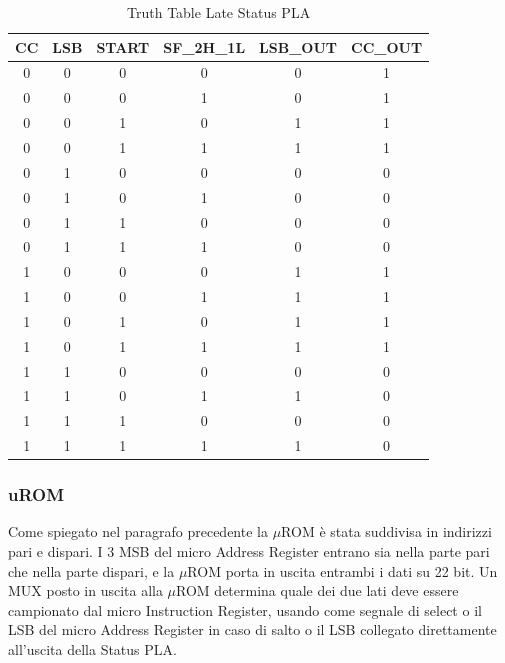 \begin{table}[h!]
    \centering
    \begin{tabular}{|c|c|c|c||c|c|}
        \hline
        CC & LSB & START & SF\_2H\_1L & LSB\_OUT & CC\_OUT \\ \hline
         0 &  0  &   0   &     0      &     0    &    1    \\ \hline
         0 &  0  &   0   &     1      &     0    &    1    \\ \hline
         0 &  0  &   1   &     0      &     1    &    1    \\ \hline
         0 &  0  &   1   &     1      &     1    &    1    \\ \hline
         0 &  1  &   0   &     0      &     0    &    0    \\ \hline
         0 &  1  &   0   &     1      &     0    &    0    \\ \hline
         0 &  1  &   1   &     0      &     0    &    0    \\ \hline
         0 &  1  &   1   &     1      &     0    &    0    \\ \hline
         1 &  0  &   0   &     0      &     1    &    1    \\ \hline
         1 &  0  &   0   &     1      &     1    &    1    \\ \hline
         1 &  0  &   1   &     0      &     1    &    1    \\ \hline
         1 &  0  &   1   &     1      &     1    &    1    \\ \hline
         1 &  1  &   0   &     0      &     0    &    0    \\ \hline
         1 &  1  &   0   &     1      &     1    &    0    \\ \hline
         1 &  1  &   1   &     0      &     0    &    0    \\ \hline
         1 &  1  &   1   &     1      &     1    &    0    \\ \hline
    \end{tabular}
    \caption{Truth Table Late Status PLA}
    \label{tab: comandi_control_unit}
\end{table}

\subsubsection{uROM}

\noindent Come spiegato nel paragrafo precedente la $\mu$ROM è stata suddivisa in indirizzi pari e dispari. I 3 MSB del micro Address Register entrano 
sia nella parte pari che nella parte dispari, e la $\mu$ROM porta in uscita entrambi i dati su 22 bit.
Un MUX posto in uscita alla $\mu$ROM determina quale dei due lati deve essere campionato dal micro Instruction Register, usando come segnale di select
o il LSB del micro Address Register in caso di salto o il LSB collegato direttamente all'uscita della Status PLA.

